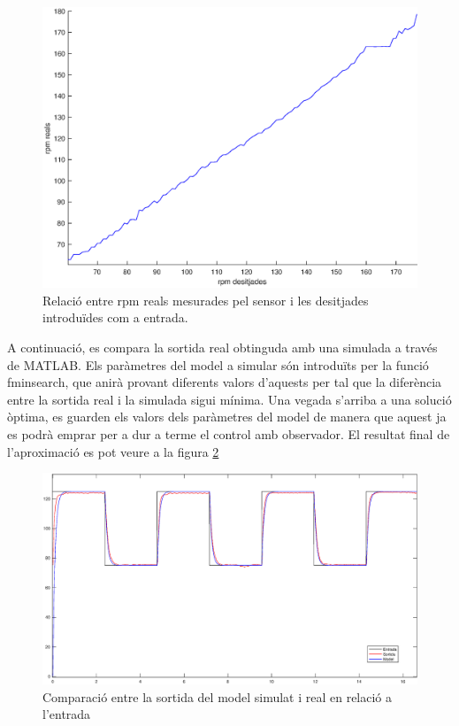 \documentclass[]{article}
\begin{document}
\begin{figure}[H]
\centering
	\includegraphics[width = .8\linewidth]{images/rpmDes_rpmReal.eps}
	\caption{Relació entre rpm reals mesurades pel sensor i les desitjades introduïdes com a entrada.}
	\label{fig:rpmReal_rpmDes}
\end{figure}


 A continuació, es compara la sortida real obtinguda amb una simulada a través de MATLAB. Els paràmetres del model a simular són introduïts per la funció fminsearch, que anirà provant diferents valors d'aquests per tal que la diferència entre la sortida real i la simulada sigui mínima. Una vegada s'arriba a una solució òptima, es guarden els valors dels paràmetres del model de manera que aquest ja es podrà emprar per a dur a terme el control amb observador. El resultat final de l'aproximació es pot veure a la figura \ref{fig:get_model}
 
 \begin{figure}[H]
\centering
	\includegraphics[width = .8\linewidth]{images/get_model.eps}
	\caption{Comparació entre la sortida del model simulat i real en relació a l'entrada }
	\label{fig:get_model}
\end{figure}
 
\end{document}
